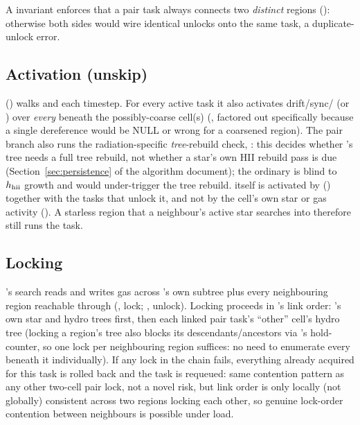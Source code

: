 A  invariant enforces that a
 pair task always connects two \emph{distinct}
 regions ():
otherwise both sides would wire identical unlocks onto the same
 task, a duplicate-unlock error.

\subsection{Activation (unskip)}
\label{sec:unskip}

 ()
walks  and 
each timestep. For every active task it also activates
drift/sync/ (or ) over
\emph{every}  beneath the possibly-coarse
 cell(s)
(, factored out
specifically because a single  dereference
would be NULL or wrong for a coarsened region). The pair branch also
runs the radiation-specific \emph{tree}-rebuild check,
: this decides whether
\swift's tree needs a full tree rebuild, not whether a star's own HII
rebuild pass is due (Section~\ref{sec:persistence} of the algorithm
document); the ordinary 
is blind to $h_{\rm hii}$ growth and would under-trigger the tree
rebuild.
 itself is activated by
 () together with
the  tasks that unlock it, and not by the cell's own star or
gas activity (). A starless region that a neighbour's
active star searches into therefore still runs the task.

\subsection{Locking}

's search reads and writes gas across
's own subtree plus every neighbouring region reachable
through  (, lock;
, unlock). Locking proceeds in
's link order: 's own star and hydro
trees first, then each linked pair task's ``other'' cell's hydro tree
(locking a region's tree also blocks its descendants/ancestors via
's hold-counter, so one lock per neighbouring
region suffices: no need to enumerate every 
beneath it individually). If any lock in the chain fails, everything
already acquired for this task is rolled back and the task is
requeued: same contention pattern as any other two-cell pair lock,
not a novel risk, but link order is only locally (not globally)
consistent across two regions locking each other, so genuine
lock-order contention between neighbours is possible under load.

